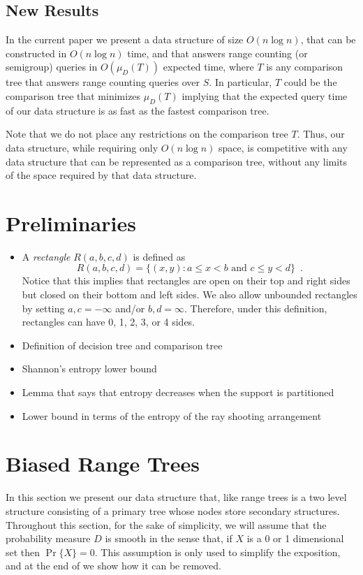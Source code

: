 \documentclass[lotsofwhite,charterfonts]{patmorin}
\begin{document}
\subsection{New Results}

In the current paper we present a data structure of size $O(n\log n)$,
that can be constructed in $O(n\log n)$ time, and that answers range
counting (or semigroup) queries in $O(\mu_D(T))$ expected time, where
$T$ is any comparison tree that answers range counting queries over $S$.
In particular, $T$ could be the comparison tree that minimizes
$\mu_D(T)$ implying that the expected query time of our data structure
is as fast as the fastest comparison tree.

Note that we do not place any restrictions on the comparison tree $T$.
Thus, our data structure, while requiring only $O(n\log n)$ space, is
competitive with any data structure that can be represented as a
comparison tree, without any limits of the space required by that data
structure.

\section{Preliminaries}

\begin{itemize}
\item A \emph{rectangle} $R(a,b,c,d)$ is defined as
\[
    R(a,b,c,d) = \{ (x,y) : \mbox{$a\le x < b$ and $c \le y < d$}\}
	\enspace .
\]
Notice that this implies that rectangles are open on their top and
right sides but closed on their bottom and left sides.  We also allow
unbounded rectangles by setting $a,c=-\infty$ and/or $b,d=\infty$.
Therefore, under this definition, rectangles can have 0, 1, 2, 3,
or 4
sides.

\item Definition of decision tree and comparison tree
\item Shannon's entropy lower bound
\item Lemma that says that entropy decreases when the support is
partitioned
\item Lower bound in terms of the entropy of the ray shooting
arrangement
\end{itemize}

\section{Biased Range Trees}

In this section we present our data structure that, like range trees
is a two level structure consisting of a primary tree whose nodes
store secondary structures.  Throughout this section, for the sake of
simplicity, we will assume that the probability measure $D$ is smooth
in the sense that, if $X$ is a 0 or 1 dimensional set then
$\Pr\{X\}=0$.  This assumption is only used to simplify the
exposition, and at the end of  we show how it can be
removed.
\end{document}
